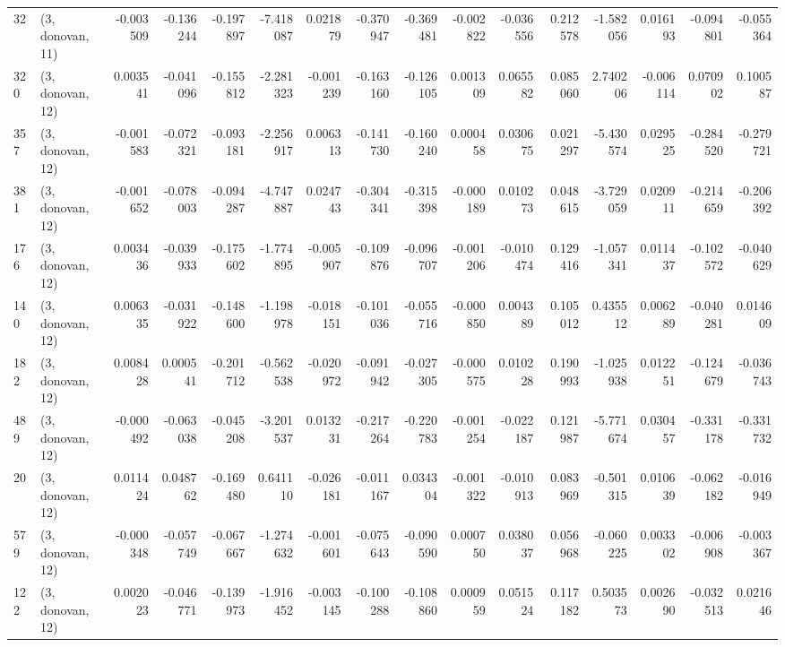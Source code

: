 \begin{tabular}{llrrrrrrrrrrrrrr}
32  &  (3, donovan, 11) &  -0.003509 & -0.136244 & -0.197897 &   -7.418087 &  0.021879 &  -0.370947 &  -0.369481 & -0.002822 & -0.036556 &  0.212578 &   -1.582056 &  0.016193 &  -0.094801 &  -0.055364 \\
320 &  (3, donovan, 12) &   0.003541 & -0.041096 & -0.155812 &   -2.281323 & -0.001239 &  -0.163160 &  -0.126105 &  0.001309 &  0.065582 &  0.085060 &    2.740206 & -0.006114 &   0.070902 &   0.100587 \\
357 &  (3, donovan, 12) &  -0.001583 & -0.072321 & -0.093181 &   -2.256917 &  0.006313 &  -0.141730 &  -0.160240 &  0.000458 &  0.030675 &  0.021297 &   -5.430574 &  0.029525 &  -0.284520 &  -0.279721 \\
381 &  (3, donovan, 12) &  -0.001652 & -0.078003 & -0.094287 &   -4.747887 &  0.024743 &  -0.304341 &  -0.315398 & -0.000189 &  0.010273 &  0.048615 &   -3.729059 &  0.020911 &  -0.214659 &  -0.206392 \\
176 &  (3, donovan, 12) &   0.003436 & -0.039933 & -0.175602 &   -1.774895 & -0.005907 &  -0.109876 &  -0.096707 & -0.001206 & -0.010474 &  0.129416 &   -1.057341 &  0.011437 &  -0.102572 &  -0.040629 \\
140 &  (3, donovan, 12) &   0.006335 & -0.031922 & -0.148600 &   -1.198978 & -0.018151 &  -0.101036 &  -0.055716 & -0.000850 &  0.004389 &  0.105012 &    0.435512 &  0.006289 &  -0.040281 &   0.014609 \\
182 &  (3, donovan, 12) &   0.008428 &  0.000541 & -0.201712 &   -0.562538 & -0.020972 &  -0.091942 &  -0.027305 & -0.000575 &  0.010228 &  0.190993 &   -1.025938 &  0.012251 &  -0.124679 &  -0.036743 \\
489 &  (3, donovan, 12) &  -0.000492 & -0.063038 & -0.045208 &   -3.201537 &  0.013231 &  -0.217264 &  -0.220783 & -0.001254 & -0.022187 &  0.121987 &   -5.771674 &  0.030457 &  -0.331178 &  -0.331732 \\
20  &  (3, donovan, 12) &   0.011424 &  0.048762 & -0.169480 &    0.641110 & -0.026181 &  -0.011167 &   0.034304 & -0.001322 & -0.010913 &  0.083969 &   -0.501315 &  0.010639 &  -0.062182 &  -0.016949 \\
579 &  (3, donovan, 12) &  -0.000348 & -0.057749 & -0.067667 &   -1.274632 & -0.001601 &  -0.075643 &  -0.090590 &  0.000750 &  0.038037 &  0.056968 &   -0.060225 &  0.003302 &  -0.006908 &  -0.003367 \\
122 &  (3, donovan, 12) &   0.002023 & -0.046771 & -0.139973 &   -1.916452 & -0.003145 &  -0.100288 &  -0.108860 &  0.000959 &  0.051524 &  0.117182 &    0.503573 &  0.002690 &  -0.032513 &   0.021646 \\

\end{tabular}
